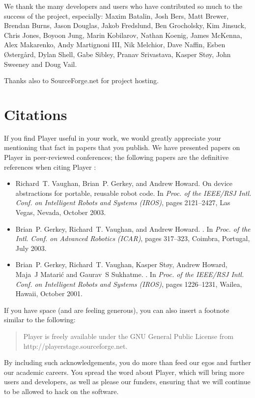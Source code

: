 \documentclass[11pt]{report}
\begin{document}
We thank the many developers and users who have contributed so much to the
success of the project, especially: 
Maxim Batalin,
Josh Bers,
Matt Brewer,
Brendan Burns,
Jason Douglas,
Jakob Fredslund,
Ben Grocholsky,
Kim Jinsuck,
Chris Jones,
Boyoon Jung,
Marin Kobilarov,
Nathan Koenig,
James McKenna,
Alex Makarenko,
Andy Martignoni III,
Nik Melchior,
Dave Naffin,
Esben \O{}sterg\aa{}rd,
Dylan Shell,
Gabe Sibley,
Pranav Srivastava,
Kasper St{\o}y,
John Sweeney 
and
Doug Vail.

Thanks also to SourceForge.net for project hosting.

\section{Citations}
If you find Player useful in your work, we would greatly appreciate
your mentioning that fact in papers that you publish.  We have presented
papers on Player in peer-reviewed conferences; the following papers are
the definitive references when citing Player
\cite{VaughanGerkeyHoward03a,GerkeyVaughan01a,GerkeyVaughanHoward03}:
\begin{itemize}
\item Richard~T. Vaughan, Brian~P. Gerkey, and Andrew Howard.
\newblock On device abstractions for portable, reusable robot code.
\newblock In {\em Proc. of the IEEE/RSJ Intl. Conf. on Intelligent Robots and
  Systems (IROS)}, pages 2121--2427, Las Vegas, Nevada, October 2003.
\item
Brian~P. Gerkey, Richard~T. Vaughan, and Andrew Howard.
.
\newblock In {\em Proc. of the Intl. Conf. on Advanced Robotics (ICAR)}, pages
  317--323, Coimbra, Portugal, July 2003.
\item
Brian~P. Gerkey, Richard~T. Vaughan, Kasper St\o{}y, Andrew Howard,
Maja~J Matari\'c and Gaurav~S Sukhatme.
.
\newblock In {\em Proc. of the IEEE/RSJ Intl. Conf. on Intelligent Robots and
  Systems (IROS)}, pages 1226--1231, Wailea, Hawaii, October 2001.
\end{itemize}
If you have space (and are feeling generous), you can also insert a footnote
similar to the following:
\begin{quote}
Player is freely available under the GNU General Public License from
http://playerstage.sourceforge.net.
\end{quote}
By including such acknowledgements, you do more than feed our egos and further 
our academic careers.  You spread the word about Player, which will bring more
users and developers, as well as please our funders, ensuring that we will
continue to be allowed to hack on the software.
\end{document}
